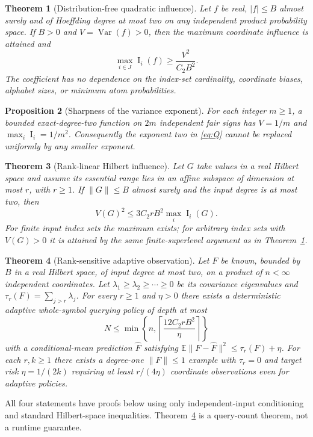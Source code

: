 \documentclass[11pt,letterpaper]{article}
\newtheorem{theorem}{Theorem}[section]
\newtheorem{proposition}[theorem]{Proposition}
\theoremstyle{definition}
\newcommand{\E}{\mathbb E}
\newcommand{\Var}{\operatorname{Var}}
\newcommand{\Inf}{\operatorname{I}}
\newcommand{\norm}[1]{\lVert #1\rVert}
\begin{document}
\begin{theorem}[Distribution-free quadratic influence]\label{thm:q}
Let $f$ be real, $|f|\le B$ almost surely and of Hoeffding degree at most
two on any independent product probability space. If $B>0$ and
$V=\Var(f)>0$, then the maximum coordinate influence is attained and
\begin{equation}\label{eq:Q}
\boxed{\max_{i\in J}\Inf_i(f)\ge\frac{V^2}{C_2B^2}.}
\end{equation}
The coefficient has no dependence on the index-set cardinality, coordinate
biases, alphabet sizes, or minimum atom probabilities.
\end{theorem}
\begin{proposition}[Sharpness of the variance exponent]\label{prop:sharp}
For each integer $m\ge1$, a bounded exact-degree-two function on
$2m$ independent fair signs has $V=1/m$ and $\max_i\Inf_i=1/m^2$.
Consequently the exponent two in \eqref{eq:Q} cannot be replaced uniformly
by any smaller exponent.
\end{proposition}
\begin{theorem}[Rank-linear Hilbert influence]\label{thm:r}
Let $G$ take values in a real Hilbert space and assume its essential range
lies in an affine subspace of dimension at most $r$, with $r\ge1$.
If $\norm{G}\le B$ almost surely and the input degree is at most two, then
\begin{equation}\label{eq:R}
\boxed{V(G)^2\le 3C_2rB^2\max_i\Inf_i(G).}
\end{equation}
For finite input index sets the maximum exists; for arbitrary index sets
with $V(G)>0$ it is attained by the same finite-superlevel argument as in
Theorem~\ref{thm:q}.
\end{theorem}
\begin{theorem}[Rank-sensitive adaptive observation]\label{thm:obs}
Let $F$ be known, bounded by $B$ in a real Hilbert space, of input degree
at most two, on a product of $n<\infty$ independent coordinates. Let
$\lambda_1\ge\lambda_2\ge\cdots\ge0$ be its covariance eigenvalues and
$\tau_r(F)=\sum_{j>r}\lambda_j$. For every $r\ge1$ and $\eta>0$ there
exists a deterministic adaptive whole-symbol querying policy of depth at most
\begin{equation}\label{eq:depth}
N\le\min\left\{n,\left\lceil\frac{12C_2rB^2}{\eta}\right\rceil\right\}
\end{equation}
with a conditional-mean prediction $\widehat F$ satisfying
$\E\norm{F-\widehat F}^2\le\tau_r(F)+\eta$.
For each $r,k\ge1$ there exists a degree-one $\norm F\le1$ example
with $\tau_r=0$ and target risk $\eta=1/(2k)$ requiring at least
$r/(4\eta)$ coordinate observations even for adaptive policies.
\end{theorem}
\noindent All four statements have proofs below using only independent-input
conditioning and standard Hilbert-space inequalities. Theorem~\ref{thm:obs}
is a query-count theorem, not a runtime guarantee.
\end{document}
